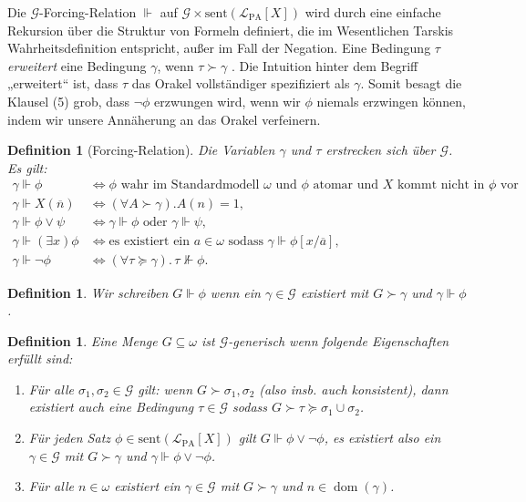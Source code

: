 \documentclass[nofonts]{uebung}
\newtheorem{definition}[theorem]{Definition}
\DeclareMathOperator{\dom}{dom}
\begin{document}
Die $\mathcal G$-Forcing-Relation $\Vdash$ auf $\mathcal G\times \mathrm{sent}(\mathcal L_{\mathrm{PA}}[X])$  wird durch eine einfache Rekursion über die Struktur von Formeln definiert, die im Wesentlichen Tarskis Wahrheitsdefinition entspricht, außer im Fall der Negation. Eine Bedingung $\tau$ \emph{erweitert} eine Bedingung $\gamma$, wenn $\tau\succ\gamma$ . Die Intuition hinter dem Begriff „erweitert“ ist, dass $\tau$ das Orakel vollständiger spezifiziert als $\gamma$. Somit besagt die Klausel (5) grob, dass $\neg\phi$ erzwungen wird, wenn wir $\phi$ niemals erzwingen können, indem wir unsere Annäherung an das Orakel verfeinern.

\begin{definition}[Forcing-Relation]
Die Variablen $\gamma$ und $\tau$ erstrecken sich über $\mathcal G$. Es gilt:
\begin{align*}
    \gamma\Vdash\phi &\iff \phi\text{ wahr im Standardmodell $\omega$ und $\phi$ atomar und $X$ kommt nicht in $\phi$ vor},\\
    \gamma\Vdash X(\overline n)&\iff(\forall A\succ\gamma).A(n)=1,\\
    \gamma\Vdash \phi\lor\psi &\iff\gamma\Vdash\phi\text{ oder } \gamma\Vdash \psi,\\
    \gamma\Vdash(\exists x)\phi &\iff \text{es existiert ein $a\in\omega$ sodass } \gamma\Vdash \phi[x/\overline{a}],\\
    \gamma\Vdash \neg\phi &\iff (\forall \tau\succeq \gamma).\,\tau\not\Vdash\phi.
\end{align*}
\end{definition}

\begin{definition}
    Wir schreiben $G\Vdash \phi$ wenn ein $\gamma\in \mathcal G$ existiert mit $G\succ \gamma$ und $\gamma\Vdash\phi$.
\end{definition}

\begin{definition}
    Eine Menge $G\subseteq\omega$ ist \emph{$\mathcal G$-generisch} wenn folgende Eigenschaften erfüllt sind:
    \begin{enumerate}
        \item Für alle $\sigma_1, \sigma_2\in \mathcal G$ gilt: wenn $G\succ \sigma_1, \sigma_2$ (also insb. auch konsistent), dann existiert auch eine Bedingung $\tau\in\mathcal G$ sodass $G\succ\tau\succeq\sigma_1\cup\sigma_2$.
        \item Für jeden Satz $\phi\in \mathrm{sent}(\mathcal L_{\mathrm{PA}}[X])$ gilt $G\Vdash \phi\lor\neg\phi$, es existiert also ein $\gamma\in\mathcal G$ mit $G\succ \gamma$ und $\gamma\Vdash \phi\lor\neg\phi$.

        \item Für alle $n\in\omega$ existiert ein $\gamma\in\mathcal G$ mit $G\succ\gamma$ und $n\in\dom(\gamma)$.
    \end{enumerate}
\end{definition}
\end{document}

